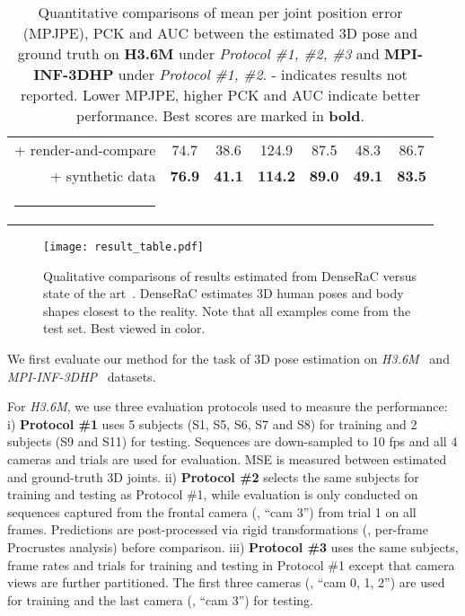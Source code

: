 \documentclass[10pt,twocolumn,letterpaper]{article}
\makeatletter
\newcommand{\beforefigcaption}{\vspace{0mm}}
\newcommand{\afterfigcaption}{\vspace{0mm}}
\newcommand{\beforetab}{\vspace{0mm}}
\newcommand{\aftertab}{\vspace{0mm}}
\newcommand{\thickhline}{\noalign {\ifnum 0=`}\fi \hrule height 1pt
    \futurelet \reserved@a \@xhline
}
\makeatother
\begin{document}
\begin{table}[ptb]
{\begin{tabular}{@{}r|c|c|c||c|c|c@{}}
+ render-and-compare & 74.7 & 38.6 & 124.9 & 87.5 & 48.3 & 86.7 \\
+ synthetic data & \bf{76.9} & \bf{41.1} & \bf{114.2} & \bf{89.0} & \bf{49.1} & \bf{83.5} \\
\hline\thickhline
\end{tabular}}
\beforetab
\caption{Quantitative comparisons of mean per joint position error (MPJPE), PCK and AUC between the estimated 3D pose and ground truth on
\textbf{H3.6M} under \textit{Protocol \#1, \#2, \#3} and \textbf{MPI-INF-3DHP} under \textit{Protocol \#1, \#2}. - indicates results not reported. Lower MPJPE, higher PCK and AUC indicate better performance. Best scores are marked in \textbf{bold}.}
\aftertab
\label{tab:pose}
\end{table}

\begin{figure*}[ptb]
\begin{center}
\texttt{[image: result\_table.pdf]}
\beforefigcaption
\caption{Qualitative comparisons of results estimated from DenseRaC versus state of the art~\cite{kanazawa2018hmr,NeuralBodyFit18,varol18_bodynet}. DenseRaC estimates 3D human poses and body shapes closest to the reality. Note that all examples come from the test set. Best viewed in color.}
\afterfigcaption
\label{fig:result_table}
\end{center}
\end{figure*}

We first evaluate our method for the task of 3D pose estimation on \textit{H3.6M}~\cite{ionescu2014human3} and \textit{MPI-INF-3DHP}~\cite{Mehta3DV17} datasets. 

For \textit{H3.6M}, we use three evaluation protocols used to measure the performance: i) \textbf{Protocol \#1} uses 5 subjects (S1, S5, S6, S7 and S8) for training and 2 subjects (S9 and S11) for testing. Sequences are down-sampled to 10 fps and all 4 cameras and trials are used for evaluation. MSE is measured between estimated and ground-truth 3D joints. ii) \textbf{Protocol \#2} selects the same subjects for training and testing as Protocol \#1, while evaluation is only conducted on sequences captured from the frontal camera (\ie, ``cam 3'') from trial 1 on all frames. Predictions are post-processed via rigid transformations (\ie, per-frame Procrustes analysis) before comparison. iii) \textbf{Protocol \#3} uses the same subjects, frame rates and trials for training and testing in Protocol \#1 except that camera views are further partitioned. The first three cameras (\ie, ``cam 0, 1, 2'') are used for training and the last camera (\ie, ``cam 3'') for testing.
\end{document}
